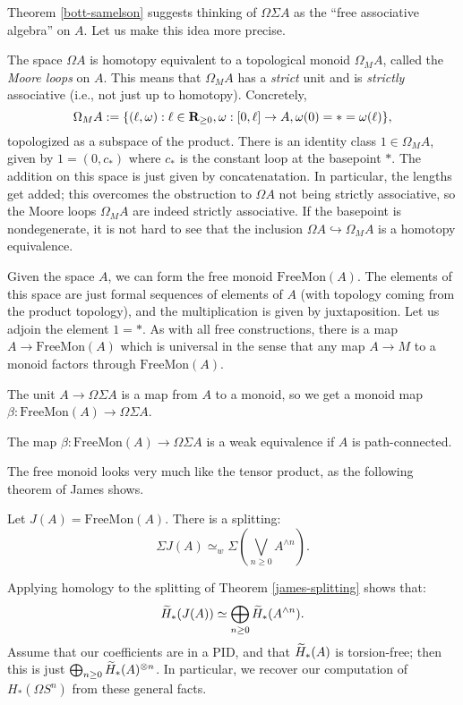 Theorem \ref{bott-samelson} suggests thinking of $\Omega \Sigma A$ as the
``free associative algebra'' on $A$. Let us make this idea more precise.
\begin{remark}
    The space $\Omega A$ is homotopy equivalent to a topological monoid
    $\Omega_M A$, called the \emph{Moore loops} on $A$. This means that
    $\Omega_M A$ has a \emph{strict} unit and is \emph{strictly} associative
    (i.e., not just up to homotopy). Concretely,
    $$\Omega_M A := \{(\ell,\omega):\ell\in\mathbf R_{\geq 0}, \omega:[0,\ell]\to A,
    \omega(0) = \ast = \omega(\ell)\},$$
    topologized as a subspace of the product. There is an identity class
    $1\in\Omega_M A$, given by $1 = (0,c_\ast)$ where $c_\ast$ is the constant
    loop at the basepoint $\ast$. The addition on this space is just given by
    concatenatation. In particular, the lengths get added; this overcomes the
    obstruction to $\Omega A$ not being strictly associative, so the Moore
    loops $\Omega_M A$ are indeed strictly associative.
    If the basepoint is nondegenerate, it is not hard to see that the inclusion
    $\Omega A\hookrightarrow \Omega_M A$ is a homotopy equivalence.

    Given the space $A$, we can form the free monoid $\mathrm{FreeMon}(A)$. The
    elements of this space are just formal sequences of elements of $A$
    (with topology coming from the product topology), and the multiplication is
    given by juxtaposition. Let us adjoin the element $1 = \ast$. As with all
    free constructions, there is a map $A\to\mathrm{FreeMon}(A)$ which is
    universal in the sense that any map $A\to M$ to a monoid factors through
    $\mathrm{FreeMon}(A)$.
    
    The unit $A\to\Omega\Sigma A$ is a map from $A$ to a monoid, so we get a
    monoid map $\beta:\mathrm{FreeMon}(A)\to\Omega\Sigma A$.
    \begin{theorem}[James]
	The map $\beta:\mathrm{FreeMon}(A)\to \Omega\Sigma A$ is a weak
	equivalence if $A$ is path-connected.
    \end{theorem}
    The free monoid looks very much like the tensor product, as the following
    theorem of James shows.
    \begin{theorem}[James]\label{james-splitting}
	Let $J(A) = \mathrm{FreeMon}(A)$. There is a splitting:
	$$
	\Sigma J(A) \simeq_w \Sigma \left(\bigvee_{n\geq 0}A^{\wedge n}\right).
	$$
    \end{theorem}
    Applying homology to the splitting of Theorem \ref{james-splitting} shows
    that:
    $$
    \widetilde{{H}}_\ast(J(A)) \simeq \bigoplus_{n\geq 0} \widetilde{{H}}_\ast(A^{\wedge n}).
    $$
    Assume that our coefficients are in a PID, and that $\widetilde{{H}}_\ast(A)$ is
    torsion-free; then this is just $\bigoplus_{n\geq 0}\widetilde{{H}}_\ast(A)^{\otimes
    n}$. In particular, we recover our computation of $H_\ast(\Omega S^n)$ from
    these general facts.
\end{remark}
